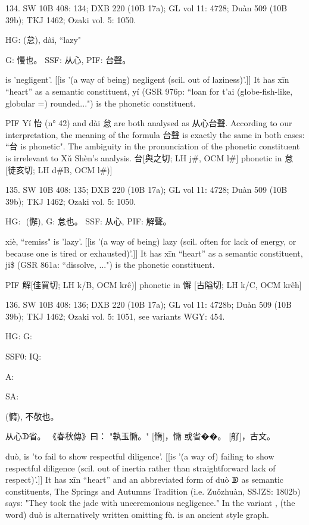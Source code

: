 134. SW 10B 408: 134; DXB 220 (10B 17a); GL vol 11: 4728; Duàn 509 (10B 39b); TKJ 1462; Ozaki vol. 5: 1050.

HG:          (怠), dài, ``lazy"

G:	慢也。
SSF: 从心,
PIF: 台聲。

is 'negligent'. [[is '(a way of being) negligent (scil. out of laziness)'.]]
It has xīn ``heart'' as a semantic constituent,
yí (GSR 976p: ``loan for t'ai (globe-fish-like, globular =) rounded...") is the phonetic constituent.

PIF Yí 怡 (n° 42) and dài 怠 are both analysed as 从心台聲. According to our interpretation, the meaning of the formula 台聲 is exactly the same in both cases: ``台 is phonetic". The ambiguity in the pronunciation of the phonetic constituent is irrelevant to Xǔ Shèn's analysis.
台[與之切; LH j\#, OCM l\#] phonetic in 怠 [徒亥切; LH d\#B, OCM l\#)]



135. SW 10B 408: 135; DXB 220 (10B 17a); GL vol 11: 4728; Duàn 509 (10B 39b); TKJ 1462; Ozaki vol. 5: 1050.

HG: ­ (懈),
G:	怠也。
SSF: 从心,
PIF: 解聲。


xiè, ``remiss"
is 'lazy'. [[is '(a way of being) lazy (scil. often for lack of energy, or because one is tired or exhausted)'.]]
It has xīn ``heart'' as a semantic constituent,
ji\$ (GSR 861a: ``dissolve, ...") is the phonetic constituent.

PIF     解[佳買切; LH k/B, OCM krê)] phonetic in 懈 [古隘切; LH k/C, OCM krêh]

136. SW 10B 408: 136; DXB 220 (10B 17a); GL vol 11: 4728b; Duàn 509 (10B 39b); TKJ 1462; Ozaki vol. 5: 1051, see
variants WGY: 454.


HG:
G:


SSF0: IQ:

A:

SA:

(憜),
不敬也。

从心ᗫ省。
《春秋傳》曰：
"執玉憜。"
[惰]，憜
或省��。
[䑠]，古文。

duò,
is 'to fail to show respectful diligence'. [[is '(a way of) failing to show respectful diligence (scil. out of inertia rather than straightforward lack of respect)'.]]
It has xīn ``heart'' and an abbreviated form of duò ᗫ as semantic constituents,
The Springs and Autumns Tradition (i.e. Zuǒzhuàn, SSJZS: 1802b) says:
"They took the jade with unceremonious negligence."
In the variant , (the word) duò is alternatively written omitting fù.
 is an ancient style graph.

